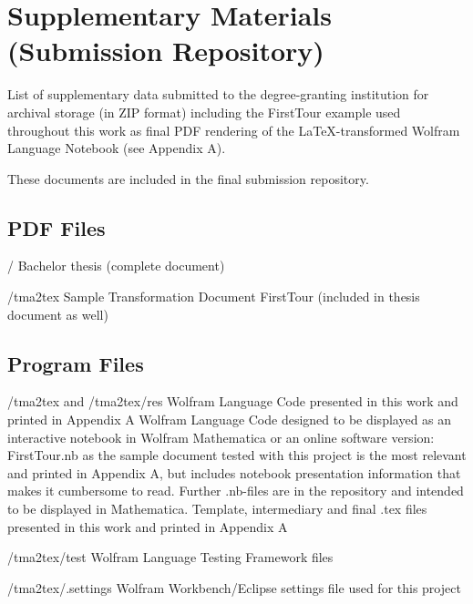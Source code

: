 \chapter{Supplementary Materials (Submission Repository)}
\label{app:Supplement}


List of supplementary data submitted to the degree-granting institution for archival storage
(in ZIP format) including the FirstTour example used throughout this work as final PDF rendering of the LaTeX-transformed Wolfram Language Notebook (see Appendix A).

These documents are included in the final submission repository.


\section{PDF Files}
\begin{FileList}{/}
 Bachelor thesis (complete document)
\end{FileList}
\begin{FileList}{/tma2tex}
 Sample Transformation Document FirstTour (included in thesis document as well)
\end{FileList}

\section{Program Files}
\begin{FileList}{/tma2tex and /tma2tex/res}
 Wolfram Language Code presented in this work and printed in Appendix A
 Wolfram Language Code designed to be displayed as an interactive notebook in Wolfram Mathematica or an online software version: FirstTour.nb as the sample document tested with this project is the most relevant and printed in Appendix A, but includes notebook presentation information that makes it cumbersome to read. Further .nb-files are in the repository and intended to be displayed in Mathematica.
 Template, intermediary and final .tex files presented in this work and printed in Appendix A
\end{FileList}
\begin{FileList}{/tma2tex/test}
 Wolfram Language Testing Framework files
\end{FileList}
\begin{FileList}{/tma2tex/.settings}
 Wolfram Workbench/Eclipse settings file used for this project
\end{FileList}
